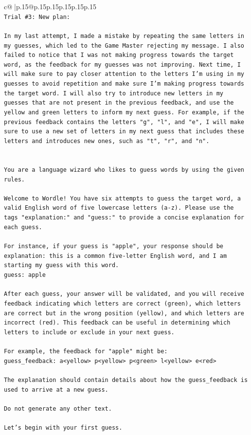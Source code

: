 \documentclass{article}
\begin{document}
{\begin{supertabular}{c@{$\;$}|p{.15\linewidth}@{}p{.15\linewidth}p{.15\linewidth}p{.15\linewidth}p{.15\linewidth}p{.15\linewidth}}
{{{\\ 
\texttt{Trial \#3: New plan: } \\
\\ 
\texttt{In my last attempt, I made a mistake by repeating the same letters in my guesses, which led to the Game Master rejecting my message. I also failed to notice that I was not making progress towards the target word, as the feedback for my guesses was not improving. Next time, I will make sure to pay closer attention to the letters I'm using in my guesses to avoid repetition and make sure I'm making progress towards the target word. I will also try to introduce new letters in my guesses that are not present in the previous feedback, and use the yellow and green letters to inform my next guess. For example, if the previous feedback contains the letters "g", "l", and "e", I will make sure to use a new set of letters in my next guess that includes these letters and introduces new ones, such as "t", "r", and "n".} \\
\\ 
\\ 
\texttt{You are a language wizard who likes to guess words by using the given rules.} \\
\\ 
\texttt{Welcome to Wordle! You have six attempts to guess the target word, a valid English word of five lowercase letters (a{-}z). Please use the tags "explanation:" and "guess:" to provide a concise explanation for each guess.} \\
\\ 
\texttt{For instance, if your guess is "apple", your response should be} \\
\texttt{explanation: this is a common five{-}letter English word, and I am starting my guess with this word.} \\
\texttt{guess: apple} \\
\\ 
\texttt{After each guess, your answer will be validated, and you will receive feedback indicating which letters are correct (green), which letters are correct but in the wrong position (yellow), and which letters are incorrect (red). This feedback can be useful in determining which letters to include or exclude in your next guess.} \\
\\ 
\texttt{For example, the feedback for "apple" might be:} \\
\texttt{guess\_feedback: a<yellow> p<yellow> p<green> l<yellow> e<red>} \\
\\ 
\texttt{The explanation should contain details about how the guess\_feedback is used to arrive at a new guess.} \\
\\ 
\texttt{Do not generate any other text.} \\
\\ 
\texttt{Let's begin with your first guess.} \\
            }
        }
    }
     \\ \\


\end{supertabular}}
\end{document}
